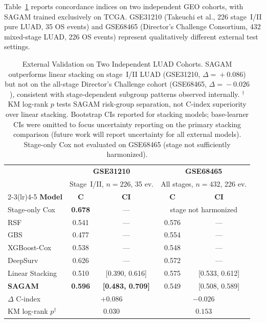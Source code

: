 \documentclass[conference]{IEEEtran}
\begin{document}
Table~\ref{tab:external} reports concordance indices on two independent
GEO cohorts, with SAGAM trained exclusively on TCGA.
GSE31210 (Takeuchi et al., 226 stage~I/II pure LUAD, 35 OS events) and
GSE68465 (Director's Challenge Consortium, 432 mixed-stage LUAD, 226 OS events)
represent qualitatively different external test settings.

\begin{table}[t]
\caption{External Validation on Two Independent LUAD Cohorts.
SAGAM outperforms linear stacking on stage~I/II LUAD
(GSE31210, $\Delta\!=\!+0.086$) but not on the all-stage Director's
Challenge cohort (GSE68465, $\Delta\!=\!-0.026$), consistent with
stage-dependent subgroup patterns observed internally.
$^\dagger$KM log-rank $p$ tests SAGAM risk-group separation, not
C-index superiority over linear stacking.
Bootstrap CIs reported for stacking models; base-learner CIs were omitted
to focus uncertainty reporting on the primary stacking comparison (future
work will report uncertainty for all external models).
Stage-only Cox not evaluated on GSE68465 (stage not sufficiently harmonized).}
\label{tab:external}
\begin{center}
\setlength\tabcolsep{2pt}
\begin{tabular}{lcccc}
\toprule
& \multicolumn{2}{c}{\textbf{GSE31210}} & \multicolumn{2}{c}{\textbf{GSE68465}} \\
& \multicolumn{2}{c}{\scriptsize Stage~I/II, $n\!=\!226$, 35 ev.} &
  \multicolumn{2}{c}{\scriptsize All stages, $n\!=\!432$, 226 ev.} \\
\cmidrule(lr){2-3}\cmidrule(lr){4-5}
\textbf{Model} & \textbf{C} & \textbf{CI} & \textbf{C} & \textbf{CI} \\
\midrule
Stage-only Cox   & \textbf{0.678} & --- & \multicolumn{2}{c}{\scriptsize stage not harmonized} \\
\midrule
RSF              & 0.541 & --- & 0.576 & --- \\
GBS              & 0.477 & --- & 0.554 & --- \\
XGBoost-Cox      & 0.538 & --- & 0.548 & --- \\
DeepSurv         & 0.626 & --- & 0.572 & --- \\
\midrule
Linear Stacking  & 0.510 & {\scriptsize[0.390, 0.616]} & 0.575 & {\scriptsize[0.533, 0.612]} \\
\textbf{SAGAM}   & \textbf{0.596} & \textbf{\scriptsize[0.483, 0.709]} & 0.549 & {\scriptsize[0.508, 0.589]} \\
\midrule
$\Delta$ C-index       & \multicolumn{2}{c}{$\mathbf{+0.086}$}
                       & \multicolumn{2}{c}{$-0.026$} \\
KM log-rank $p^\dagger$ & \multicolumn{2}{c}{$0.030$}
                       & \multicolumn{2}{c}{$0.153$} \\
\bottomrule
\end{tabular}
\end{center}
\end{table}
\end{document}

